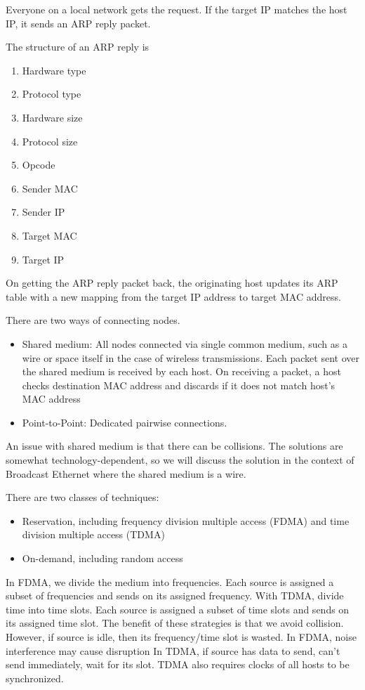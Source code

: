 Everyone on a local network gets the
request. If the target IP matches the host
IP, it sends an ARP reply packet.

The structure of an ARP reply is
\begin{enumerate}
    \item Hardware type
    \item Protocol type
    \item Hardware size
    \item Protocol size
    \item Opcode
    \item Sender MAC
    \item Sender IP
    \item Target MAC
    \item Target IP
\end{enumerate}

On getting the ARP reply packet back,
the originating host updates its ARP
table with a new mapping from the target
IP address to target MAC address.

There are two ways of connecting nodes.
\begin{itemize}
    \item Shared medium: All nodes connected via single common medium,
          such as a wire or space itself in the case of wireless transmissions.
          Each packet sent over the shared medium is received by each host.
          On receiving a packet, a host checks destination MAC address
          and discards if it does not match host's MAC address
    \item Point-to-Point: Dedicated pairwise connections.
\end{itemize}

An issue with shared medium is that there can be collisions.
The solutions are somewhat technology-dependent, so
we will discuss the solution in the context of
Broadcast Ethernet where the shared medium is a wire.

There are two classes of techniques:
\begin{itemize}
    \item Reservation, including frequency division multiple access (FDMA) and
          time division multiple access (TDMA)
    \item On-demand, including random access
\end{itemize}

In FDMA, we divide the medium into frequencies.
Each source is assigned a subset of frequencies and
sends on its assigned frequency. With TDMA, divide time
into time slots. Each source is assigned a subset of time slots and
sends on its assigned time slot. The benefit of these
strategies is that we avoid collision.
However, if source is idle, then its frequency/time slot is wasted.
In FDMA, noise interference may cause disruption
In TDMA, if source has data to send, can't send immediately,
wait for its slot. TDMA also requires clocks of all hosts to be
synchronized.

